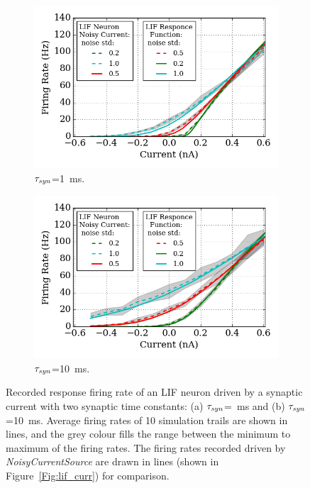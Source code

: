 	\begin{figure}[tbp!]
		\centering
		\begin{subfigure}[t]{0.49\textwidth}
			\DIFdelbeginFL %
\DIFdelendFL \DIFaddbeginFL \includegraphics[width=\textwidth]{pics_iconip/revise_spike_curve-1.png}
			\DIFaddendFL \caption{$\tau_{\textit{\textrm{syn}}}$=1~ms.}
		\end{subfigure}
		\begin{subfigure}[t]{0.49\textwidth}
			\DIFdelbeginFL %
\DIFdelendFL \DIFaddbeginFL \includegraphics[width=\textwidth]{pics_iconip/revise_spike_curve-2.png}
			\DIFaddendFL \caption{$\tau_{\textit{\textrm{syn}}}$=10~ms.}
		\end{subfigure}
		\caption[Recorded response firing rate driven by a synaptic current.]{Recorded response firing rate of an LIF neuron driven by a synaptic current with two synaptic time constants: (a) $\tau_{\textit{\textrm{syn}}}$=\DIFdelbeginFL {}\DIFdelendFL \DIFaddbeginFL {}\DIFaddendFL ~ms and (b) $\tau_{\textit{\textrm{syn}}}$=10~ms. Average firing rates of 10 simulation trails are shown in \DIFdelbeginFL {}\DIFdelendFL \DIFaddbeginFL {}\DIFaddendFL lines, and the grey colour fills the range between the minimum to maximum of the firing rates. The firing rates recorded driven by \textit{NoisyCurrentSource} are drawn in \DIFdelbeginFL {}\DIFdelendFL \DIFaddbeginFL {}\DIFaddendFL lines (shown in Figure~\ref{Fig:lif_curr}) for comparison.}

\end{figure}
